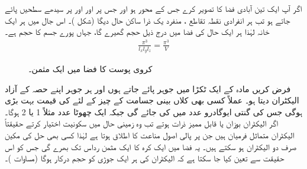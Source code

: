  
اگر آپ ایک تین آبادی فضا کا تصویر کرے جس کے محور   ہو اور جس پر  اور  اور  پر سیدھے سطحیں   پائے  جاتے ہو تب ہر انفرادی نقطہ تقاطع  ،  منفرد یک ذرا ساکن حال دیگا (شکل )۔ اس جال میں ہر ایک خانہ لہٰذا ہر ایک حال کی فضا میں درج ذیل حجم گھیرے گا، جہاں  پورے جسم کا حجم ہے۔
 \begin{align}
\frac{\pi^{3}}{l_{x}l_{y}l_{z}}=\frac{\pi^{3}}{V}\end{align}



 \begin{figure}
\centering
{}%
\caption{ کروی پوست کا   فضا میں ایک مثمن۔}
\label{شکل_متماثل_کروی_پوست_مثمن}
\end{figure}

	فرض کریں مادہ کے ایک ٹکڑا میں  جوہر پائے جاتے ہوں اور ہر جوہر اپنے حصہ کے  آزاد الیکٹران دیتا ہو۔ عملاً کسی بھی کلاں بینی جسامت کے چیز کے لئے  کی قیمت بہت بڑی ہوگی جس کی گنتی  ایوگادرو  عدد میں کی  جائے گی جبکہ  ایک چھوٹا عدد مثلاً 1 یا 2 ہوگا۔ اگر الیکٹران بوزان یا قابل ممیز ذرات ہوتے تب وہ زمینی حال  میں سکونیت اختیار کرتے حقیقتاً الیکٹران  متماثل فرمیان ہیں جن پر پالی اصول مناعت کا اطلاق ہوتا ہے لہٰذا کسی بھی حل کی مکین صرف دو الیکٹران ہو سکتے ہیں۔ یہ  فضا میں ایک کرہ کا ایک مثمن رداس  تک بھرے گی جس کو اس حقیقت سے تعین کیا جا سکتا ہے کہ الیکٹران کی ہر ایک جوڑی کو  حجم درکار ہوگا  (مساوات )۔

